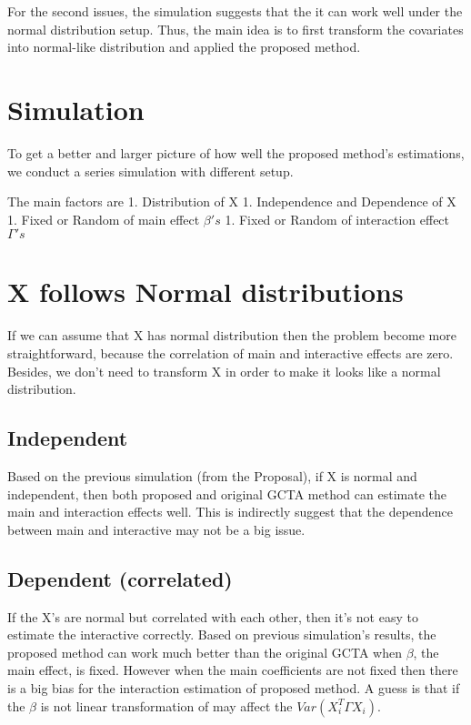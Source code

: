 \documentclass[]{article}
\begin{document}
For the second issues, the simulation suggests that the it can work well
under the normal distribution setup. Thus, the main idea is to first
transform the covariates into normal-like distribution and applied the
proposed method.

\section{Simulation}\label{simulation}

To get a better and larger picture of how well the proposed method's
estimations, we conduct a series simulation with different setup.

The main factors are 1. Distribution of X 1. Independence and Dependence
of X 1. Fixed or Random of main effect \(\beta's\) 1. Fixed or Random of
interaction effect \(\Gamma's\)

\section{X follows Normal
distributions}\label{x-follows-normal-distributions}

If we can assume that X has normal distribution then the problem become
more straightforward, because the correlation of main and interactive
effects are zero. Besides, we don't need to transform X in order to make
it looks like a normal distribution.

\subsection{Independent}\label{independent}

Based on the previous simulation (from the Proposal), if X is normal and
independent, then both proposed and original GCTA method can estimate
the main and interaction effects well. This is indirectly suggest that
the dependence between main and interactive may not be a big issue.

\subsection{Dependent (correlated)}\label{dependent-correlated}

If the X's are normal but correlated with each other, then it's not easy
to estimate the interactive correctly. Based on previous simulation's
results, the proposed method can work much better than the original GCTA
when \(\beta\), the main effect, is fixed. However when the main
coefficients are not fixed then there is a big bias for the interaction
estimation of proposed method. A guess is that if the \(\beta\) is not
linear transformation of may affect the \(Var(X_i^T\Gamma X_i)\).
\end{document}
